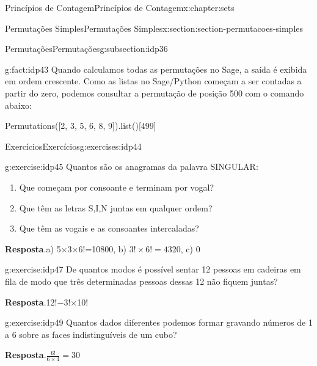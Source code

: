 \documentclass[oneside,10pt,]{book}
\newcommand{\blocktitlefont}{\relax}
\numberwithin{equation}{section}
\begin{document}
\begin{chapterptx}{Princípios de Contagem}{}{Princípios de Contagem}{}{}{x:chapter:sets}
\begin{sectionptx}{Permutações Simples}{}{Permutações Simples}{}{}{x:section:section-permutacoes-simples}
\begin{subsectionptx}{Permutações}{}{Permutações}{}{}{g:subsection:idp36}
\begin{fact}{}{}{g:fact:idp43}
Quando calculamos todas as permutações no Sage, a saída é exibida em ordem crescente. Como as listas no Sage\slash{}Python começam a ser contadas a partir do zero, podemos consultar a permutação de posição 500 com o comando abaixo:%
\begin{sageinput}
Permutations([2, 3, 5, 6, 8, 9]).list()[499]
\end{sageinput}
\begin{sageoutput}
[8, 2, 9, 3, 6, 5]
\end{sageoutput}
\end{fact}
\end{subsectionptx}
%
%
\typeout{************************************************}
\typeout{************************************************}
%
\begin{exercises-subsection}{Exercícios}{}{Exercícios}{}{}{g:exercises:idp44}
\begin{divisionexercise}{1}{}{}{g:exercise:idp45}%
Quantos são os anagramas da palavra SINGULAR:%
%
\begin{multicols}{1}
\begin{enumerate}[label=(\alph*)]
\item{}Que começam por consoante e terminam por vogal?%
\item{}Que têm as letras S,I,N juntas em qualquer ordem?%
\item{}Que têm as vogais e as consoantes intercaladas?%
\end{enumerate}
\end{multicols}
\par\smallskip%
\noindent\textbf{\blocktitlefont Resposta}.\hypertarget{g:answer:idp46}{}\quad{}a) 5×3×6!=10800, b) \(3!\times 6!=4320\), c) 0%
\end{divisionexercise}%
\begin{divisionexercise}{2}{}{}{g:exercise:idp47}%
De quantos modos é possível sentar 12 pessoas em cadeiras em fila de modo que três determinadas pessoas dessas 12 não fiquem juntas?%
\par\smallskip%
\noindent\textbf{\blocktitlefont Resposta}.\hypertarget{g:answer:idp48}{}\quad{}12!−3!×10!%
\end{divisionexercise}%
\begin{divisionexercise}{3}{}{}{g:exercise:idp49}%
Quantos dados diferentes podemos formar gravando números de 1 a 6 sobre as faces indistinguíveis de um cubo?%
\par\smallskip%
\noindent\textbf{\blocktitlefont Resposta}.\hypertarget{g:answer:idp50}{}\quad{}\(\frac{6!}{6\times 4} = 30 \)%

\end{divisionexercise}
\end{exercises-subsection}
\end{sectionptx}
\end{chapterptx}
\end{document}
